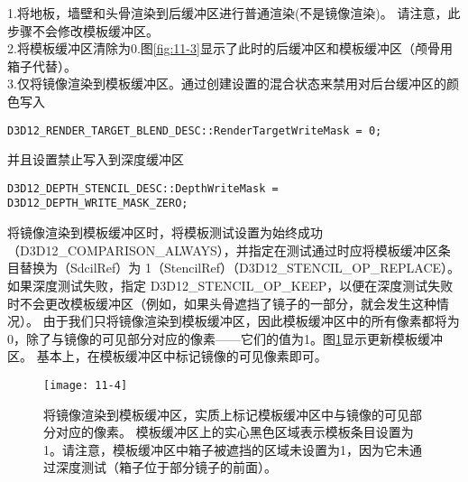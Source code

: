 \begin{flushleft}
1.将地板，墙壁和头骨渲染到后缓冲区进行普通渲染(不是镜像渲染)。 请注意，此步骤不会修改模板缓冲区。\\
2.将模板缓冲区清除为0.图\ref{fig:11-3}显示了此时的后缓冲区和模板缓冲区（颅骨用箱子代替）。\\
3.仅将镜像渲染到模板缓冲区。通过创建设置的混合状态来禁用对后台缓冲区的颜色写入\\
\end{flushleft}
\begin{lstlisting}
D3D12_RENDER_TARGET_BLEND_DESC::RenderTargetWriteMask = 0;
\end{lstlisting}
\begin{flushleft}
并且设置禁止写入到深度缓冲区\\
\end{flushleft}
\begin{lstlisting}
D3D12_DEPTH_STENCIL_DESC::DepthWriteMask = D3D12_DEPTH_WRITE_MASK_ZERO;
\end{lstlisting}
\begin{flushleft}
将镜像渲染到模板缓冲区时，将模板测试设置为始终成功（D3D12\_COMPARISON\_ALWAYS），并指定在测试通过时应将模板缓冲区条目替换为（SdcilRef）为 1（StencilRef）（D3D12\_STENCIL\_OP\_REPLACE）。如果深度测试失败，指定 D3D12\_STENCIL\_OP\_KEEP，以便在深度测试失败时不会更改模板缓冲区（例如，如果头骨遮挡了镜子的一部分，就会发生这种情况）。 由于我们只将镜像渲染到模板缓冲区，因此模板缓冲区中的所有像素都将为0，除了与镜像的可见部分对应的像素——它们的值为1。图\ref{fig:11-4}显示更新模板缓冲区。 基本上，在模板缓冲区中标记镜像的可见像素即可。
\end{flushleft}
\begin{figure}[h]
    \texttt{[image: 11-4]}
    \centering
    \caption{将镜像渲染到模板缓冲区，实质上标记模板缓冲区中与镜像的可见部分对应的像素。 模板缓冲区上的实心黑色区域表示模板条目设置为1。请注意，模板缓冲区中箱子被遮挡的区域未设置为1，因为它未通过深度测试（箱子位于部分镜子的前面）。}
    \label{fig:11-4}
\end{figure}

